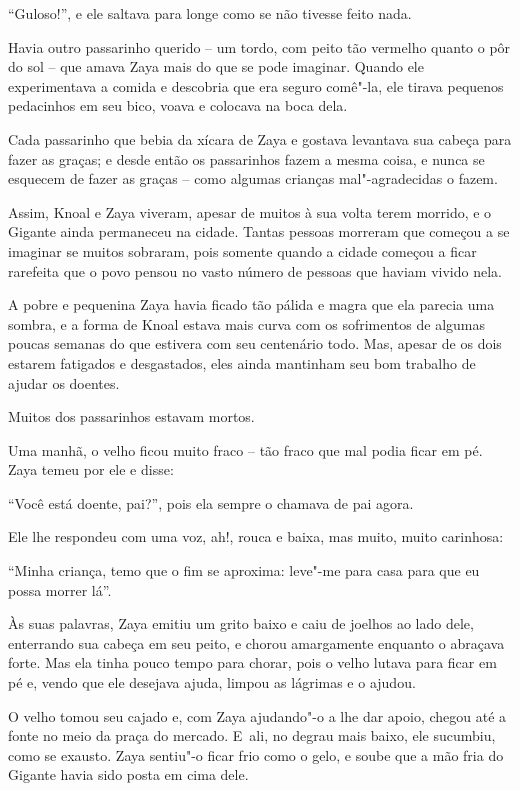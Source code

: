 ``Guloso!'', e ele saltava para longe como se não tivesse feito nada.

Havia outro passarinho querido -- um tordo, com peito tão vermelho
quanto o pôr do sol -- que amava Zaya mais do que se pode imaginar.
Quando ele experimentava a comida e descobria que era seguro comê"-la,
ele tirava pequenos pedacinhos em seu bico, voava e colocava na boca
dela.

Cada passarinho que bebia da xícara de Zaya e gostava levantava sua
cabeça para fazer as graças; e desde então os passarinhos fazem a mesma
coisa, e nunca se esquecem de fazer as graças -- como algumas crianças
mal"-agradecidas o fazem.

Assim, Knoal e Zaya viveram, apesar de muitos à sua volta terem morrido,
e o Gigante ainda permaneceu na cidade. Tantas pessoas morreram que
começou a se imaginar se muitos sobraram, pois somente quando a cidade
começou a ficar rarefeita que o povo pensou no vasto número de pessoas
que haviam vivido nela.

A pobre e pequenina Zaya havia ficado tão pálida e magra que ela parecia
uma sombra, e a forma de Knoal estava mais curva com os sofrimentos de
algumas poucas semanas do que estivera com seu centenário todo. Mas,
apesar de os dois estarem fatigados e desgastados, eles ainda mantinham
seu bom trabalho de ajudar os doentes.

Muitos dos passarinhos estavam mortos.

Uma manhã, o velho ficou muito fraco -- tão fraco que mal podia ficar em
pé. Zaya temeu por ele e disse:

``Você está doente, pai?'', pois ela sempre o chamava de pai agora.

Ele lhe respondeu com uma voz, ah!, rouca e baixa, mas muito, muito
carinhosa:

``Minha criança, temo que o fim se aproxima: leve"-me para casa para que
eu possa morrer lá''.

Às suas palavras, Zaya emitiu um grito baixo e caiu de joelhos ao lado
dele, enterrando sua cabeça em seu peito, e chorou amargamente enquanto
o abraçava forte. Mas ela tinha pouco tempo para chorar, pois o velho
lutava para ficar em pé e, vendo que ele desejava ajuda, limpou as
lágrimas e o ajudou.

O velho tomou seu cajado e, com Zaya ajudando"-o a lhe dar apoio, chegou
até a fonte no meio da praça do mercado. E~ali, no degrau mais baixo,
ele sucumbiu, como se exausto. Zaya sentiu"-o ficar frio como o gelo, e
soube que a mão fria do Gigante havia sido posta em cima dele.

